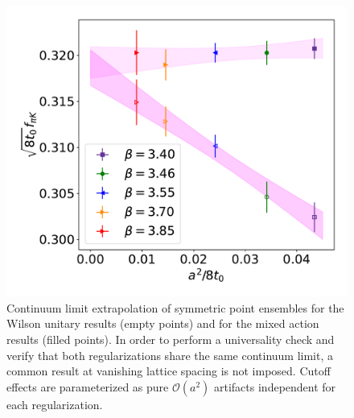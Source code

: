 \begin{figure}
    \centering
    \includegraphics[width=1.\textwidth]{./cap5/figs/continuum_sym.pdf}
    \caption{Continuum limit extrapolation of symmetric point ensembles for the Wilson unitary results (empty points) and for the mixed action results (filled points). In order to perform a universality check and verify that both regularizations share the same continuum limit, a common result at vanishing lattice spacing is not imposed. Cutoff effects are parameterized as pure $\mathcal{O}(a^2)$ artifacts independent for each regularization.}
    \label{ch_ss:fig:universality}
\end{figure}


